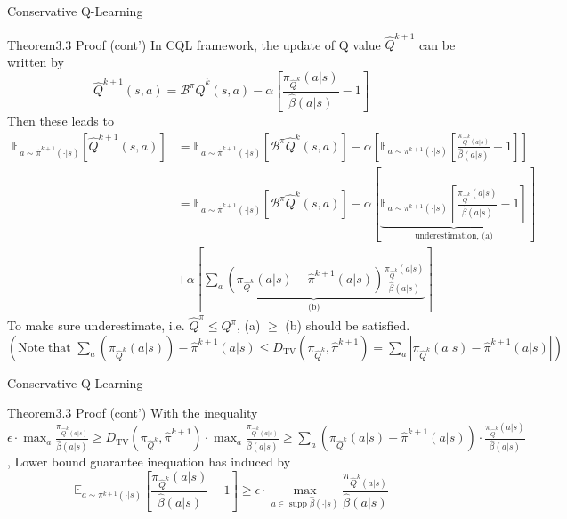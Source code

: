\documentclass[11pt]{beamer}
\newcommand{\mbb}[1]{\mathbb{#1}}
\newcommand{\mc}[1]{\mathcal{#1}}
\newcommand{\abs}[1]{\left\lvert #1 \right\rvert}
\newcommand{\supp}{\operatorname{supp}}
\begin{document}
\begin{frame}{Conservative Q-Learning}
  \begin{block}{Theorem3.3 Proof (cont')}
    In CQL framework, the update of Q value $\hat{Q}^{k+1}$ can be written by
    \[
      \hat{Q}^{k+1}(s,a) = \mc{B}^{\pi}\hat{Q}^{k} (s,a) - \alpha \left[\frac{\pi_{\hat{Q}^k}(a|s)}{\hat{\beta}(a|s)} - 1\right]
    \]
    Then these leads to
    \[
      \begin{aligned}
        \mbb{E}_{a \sim \hat{\pi}^{k+1} (\cdot|s)} [\hat{Q}^{k+1} (s,a)] &= \mbb{E}_{a \sim \hat{\pi}^{k+1}(\cdot|s)} [\mc{B}^\pi \hat{Q}^k(s,a)] - \alpha \left[\mbb{E}_{a \sim \pi^{k+1}(\cdot|s)}\left[\frac{\pi_{\hat{Q}^k(a|s)}}{\hat{\beta}(a|s)} -1 \right] \right] \\
        &= \mbb{E}_{a \sim \hat{\pi}^{k+1}(\cdot | s)} [\mc{B}^\pi \hat{Q}^{k}(s,a)] - \alpha \left[\underbrace{\mbb{E}_{a \sim \pi^{k+1}(\cdot|s)}\left[\frac{\pi_{\hat{Q}^k}(a|s)}{\hat{\beta}(a|s)} -1\right]}_{\text{underestimation, (a)}} \right] \\
         &+ \alpha \left[ \underbrace{\sum_a \left( \pi_{\hat{Q}^k}(a|s) - \hat{\pi}^{k+1}(a|s)\right) \frac{\pi_{\hat{Q}^k}(a|s)}{\hat{\beta} (a|s)}}_{\text{(b)}}  \right]
      \end{aligned}
    \]
    To make sure underestimate, i.e. $\hat{Q}^{\pi} \leq Q^\pi$, (a) $\geq$ (b) should be satisfied.
    $\left( \text{Note that }\sum_a (\pi_{\hat{Q}^k}(a|s))-\hat{\pi}^{k+1}(a|s) \leq D_{\text{TV}}(\pi_{\hat{Q}^k}, \hat{\pi}^{k+1}) = \sum_a \abs{\pi_{\hat{Q}^k}(a|s) - \hat{\pi}^{k+1} (a|s)}\right)$
  \end{block}
\end{frame}

\begin{frame}{Conservative Q-Learning}
  \begin{block}{Theorem3.3 Proof (cont')}
    With the inequality $\epsilon \cdot \max_a \frac{\pi_{\hat{Q}^k(a|s)}}{\hat{\beta}(a|s)} \geq D_{\text{TV}}(\pi_{\hat{Q}^k}, \hat{\pi}^{k+1}) \cdot \max_a \frac{\pi_{\hat{Q}^k(a|s)}}{\hat{\beta}(a|s)} \geq \sum_a \left(\pi_{\hat{Q}^k}(a|s) - \hat{\pi}^{k+1}(a|s)\right) \cdot \frac{\pi_{\hat{Q}^k}(a|s)}{\hat{\beta}(a|s)}$,
    Lower bound guarantee inequation has induced by
    \[
      \mbb{E}_{a \sim \pi^{k+1}(\cdot|s)}\left[\frac{\pi_{\hat{Q}^k}(a|s)}{\hat{\beta}(a|s)} -1\right] \geq \epsilon \cdot \max_{a \in \supp \hat{\beta}(\cdot | s)} \frac{\pi_{\hat{Q}^k(a|s)}}{\hat{\beta}(a|s)}
    \]
  \end{block}
\end{frame}
\end{document}
